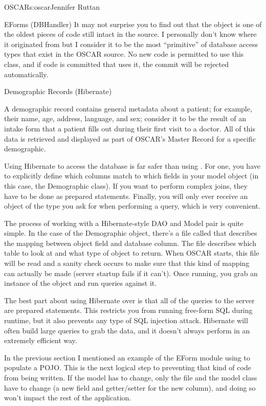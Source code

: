 \begin{aosachapter}{OSCAR}{s:oscar}{Jennifer Ruttan}
\begin{aosasect2}{EForms (DBHandler)}
It may not surprise you to find out that the  object
is one of the oldest pieces of code still intact in the source. I
personally don't know where it originated from but I consider it to be
the most ``primitive'' of database access types that exist in the
OSCAR source. No new code is permitted to use this class, and if 
code is committed that uses it, the commit will be
rejected automatically.

\end{aosasect2}

\begin{aosasect2}{Demographic Records (Hibernate)}

A demographic record contains general metadata about a patient; for
example, their name, age, address, language, and sex; consider it to
be the result of an intake form that a patient fills out during their
first visit to a doctor. All of this data is retrieved and displayed
as part of OSCAR's Master Record for a specific demographic.

Using Hibernate to access the database is far safer than
using . For one, you have to explicitly define which
columns match to which fields in your model object (in this case, the
Demographic class). If you want to perform complex joins, they have to
be done as prepared statements. Finally, you will only ever receive an
object of the type you ask for when performing a query, which is very
convenient.

The process of working with a Hibernate-style DAO and Model pair is
quite simple. In the case of the Demographic object, there's a file
called  that describes the mapping between object
field and database column. The file describes which table to look at
and what type of object to return. When OSCAR starts, this file will
be read and a sanity check occurs to make sure that this kind of
mapping can actually be made (server startup fails if it can't). Once
running, you grab an instance of the  object and run
queries against it.

The best part about using Hibernate over  is that all
of the queries to the server are prepared statements. This restricts
you from running free-form SQL during runtime, but it also prevents
any type of SQL injection attack. Hibernate will often build large
queries to grab the data, and it doesn't always perform in an
extremely efficient way.

In the previous section I mentioned an example of the EForm module
using  to populate a POJO. This is the next logical
step to preventing that kind of code from being written. If the model
has to change, only the  file and the model class have
to change (a new field and getter/setter for the new column), and
doing so won't impact the rest of the application.


\end{aosasect2}
\end{aosachapter}
